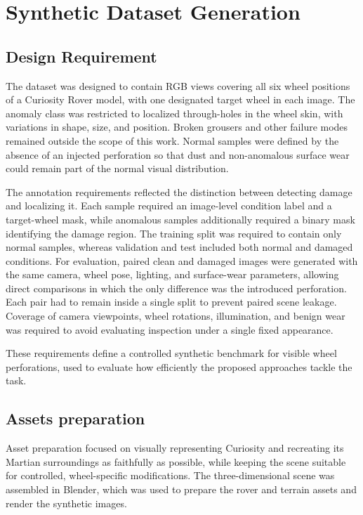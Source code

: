 \chapter{Synthetic Dataset Generation}


\section{Design Requirement}
The dataset was designed to contain RGB views covering all six wheel positions of a Curiosity Rover model, with one designated target wheel in each image. The anomaly class was restricted to localized through-holes in the wheel skin, with variations in shape, size, and position. Broken grousers and other failure modes remained outside the scope of this work. Normal samples were defined by the absence of an injected perforation so that dust and non-anomalous surface wear could remain part of the normal visual distribution.

The annotation requirements reflected the distinction between detecting damage and localizing it. Each sample required an image-level condition label and a target-wheel mask, while anomalous samples additionally required a binary mask identifying the damage region. The training split was required to contain only normal samples, whereas validation and test included both normal and damaged conditions. For evaluation, paired clean and damaged images were generated with the same camera, wheel pose, lighting, and surface-wear parameters, allowing direct comparisons in which the only difference was the introduced perforation. Each pair had to remain inside a single split to prevent paired scene leakage. Coverage of camera viewpoints, wheel rotations, illumination, and benign wear was required to avoid evaluating inspection under a single fixed appearance.

These requirements define a controlled synthetic benchmark for visible wheel perforations, used to evaluate how efficiently the proposed approaches tackle the task.

\section{Assets preparation}
Asset preparation focused on visually representing Curiosity and recreating its Martian surroundings as faithfully as possible, while keeping the scene suitable for controlled, wheel-specific modifications. The three-dimensional scene was assembled in Blender, which was used to prepare the rover and terrain assets and render the synthetic images.

